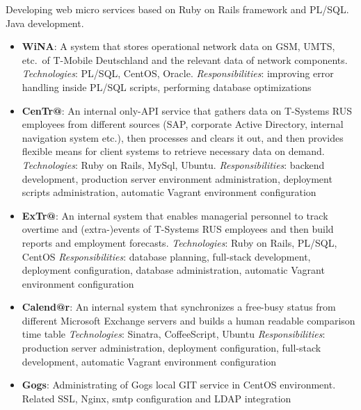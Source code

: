 \documentclass{cv}
\begin{document}
\begin{cvblock}{%
  }

  Developing web micro services based on Ruby on Rails framework and PL/SQL\@.
  Java development.

  \begin{itemize}
    \item \textbf{WiNA}:
      A system that stores operational network data on GSM,
      UMTS, etc.\ of T-Mobile Deutschland and the relevant data of
      network components. \textit{Technologies}: PL/SQL, CentOS, Oracle. 
      \textit{Responsibilities}: improving error handling inside PL/SQL scripts, 
      performing database optimizations

    \item \textbf{CenTr@}:
      An internal only-API service that gathers data on T-Systems RUS employees
      from different sources (SAP, corporate Active Directory,
      internal navigation system etc.), then processes and clears it out, and
      then provides flexible means for client systems to retrieve necessary
      data on demand. \textit{Technologies}: Ruby on Rails, MySql, Ubuntu.
      \textit{Responsibilities}: backend development, production server
      environment administration, deployment scripts administration,
      automatic Vagrant environment configuration

    \item \textbf{ExTr@}:
      An internal system that enables managerial personnel to track overtime
      and (extra-)events of T-Systems RUS employees and then build reports and
      employment forecasts.
      \textit{Technologies}: Ruby on Rails, PL/SQL, CentOS
      \textit{Responsibilities}: database planning, full-stack development,
      deployment configuration, database administration, automatic Vagrant
      environment configuration

\end{itemize}\end{cvblock}\begin{cvblock}{}\begin{itemize}

    \item \textbf{Calend@r}:
      An internal system that synchronizes a free-busy status from different
      Microsoft Exchange servers and builds a human readable comparison time
      table
      \textit{Technologies}: Sinatra, CoffeeScript, Ubuntu
      \textit{Responsibilities}: production server administration, deployment
      configuration, full-stack development, automatic Vagrant environment
      configuration
    \item \textbf{Gogs}:
      Administrating of Gogs local GIT service in CentOS environment. Related
      SSL, Nginx, smtp configuration and LDAP integration

  \end{itemize}
\end{cvblock}
\end{document}
